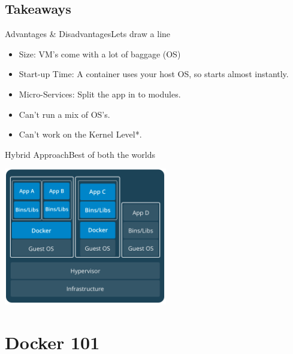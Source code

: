 \documentclass{beamer}
\begin{document}
\subsection{Takeaways}
\begin{frame}{Advantages \& Disadvantages}{Lets draw a line}

{\Large 
\begin{itemize}
    \item \alert{Size}: VM's come with a lot of baggage (OS)
    \item \alert{Start-up Time}: A container uses your host OS, so starts almost instantly.
    \item \alert{Micro-Services}: Split the app in to modules. 
\end{itemize}
    \hrulefill
    
\begin{itemize}
    \item \alert{Can't} run a mix of OS's.
    \item \alert{Can't} work on the Kernel Level*.
\end{itemize}
}
\end{frame}

\begin{frame}{Hybrid Approach}{Best of both the worlds}
\begin{center}
    \includegraphics[height=6cm]{hybrid.png}
\end{center}
\end{frame}


\section{Docker 101}
\end{document}
